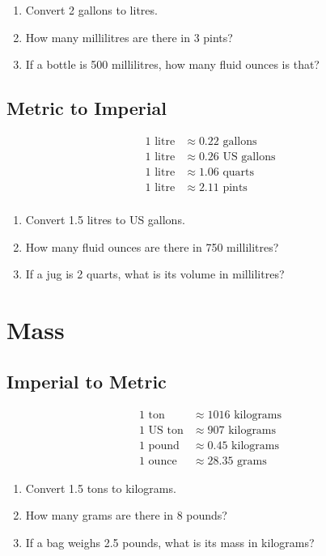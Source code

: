 \documentclass{article}
\begin{document}
\begin{enumerate}
    \item Convert 2 gallons to litres.
    \item How many millilitres are there in 3 pints?
    \item If a bottle is 500 millilitres, how many fluid ounces is that?
\end{enumerate}

\subsection*{Metric to Imperial}

\begin{align*}
1 \text{ litre} &\approx 0.22 \text{ gallons} \\
1 \text{ litre} &\approx 0.26 \text{ US gallons} \\
1 \text{ litre} &\approx 1.06 \text{ quarts} \\
1 \text{ litre} &\approx 2.11 \text{ pints} \\
\end{align*}

\begin{enumerate}
    \item Convert 1.5 litres to US gallons.
    \item How many fluid ounces are there in 750 millilitres?
    \item If a jug is 2 quarts, what is its volume in millilitres?
\end{enumerate}

\section*{Mass}

\subsection*{Imperial to Metric}

\begin{align*}
1 \text{ ton} &\approx 1016 \text{ kilograms} \\
1 \text{ US ton} &\approx 907 \text{ kilograms} \\
1 \text{ pound} &\approx 0.45 \text{ kilograms} \\
1 \text{ ounce} &\approx 28.35 \text{ grams}
\end{align*}

\begin{enumerate}
    \item Convert 1.5 tons to kilograms.
    \item How many grams are there in 8 pounds?
    \item If a bag weighs 2.5 pounds, what is its mass in kilograms?
\end{enumerate}
\end{document}
